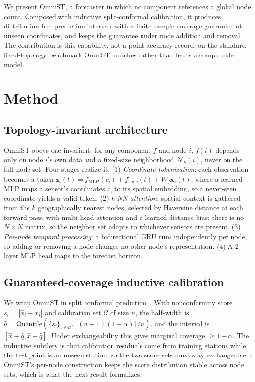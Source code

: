 \documentclass[conference]{IEEEtran}
\begin{document}
We present OmniST, a forecaster in which no component references a global node count. Composed with
inductive split-conformal calibration, it produces distribution-free prediction intervals with a
finite-sample coverage guarantee at unseen coordinates, and keeps the guarantee under node addition and
removal. The contribution is this capability, not a point-accuracy record: on the standard
fixed-topology benchmark OmniST matches rather than beats a comparable model.

\section{Method}

\subsection{Topology-invariant architecture}
OmniST obeys one invariant: for any component $f$ and node $i$, $f(i)$ depends only on node $i$'s own
data and a fixed-size neighborhood $\mathcal{N}_k(i)$, never on the full node set. Four stages realize
it. (1) \emph{Coordinate tokenization}: each observation becomes a token
$\mathbf{z}_i(t)=f_{\text{MLP}}(c_i)+f_{\text{time}}(t)+W_f\mathbf{x}_i(t)$, where a learned MLP maps a
sensor's coordinates $c_i$ to its spatial embedding, so a never-seen coordinate yields a valid token.
(2) \emph{$k$-NN attention}: spatial context is gathered from the $k$ geographically nearest nodes,
selected by Haversine distance at each forward pass, with multi-head attention and a learned distance
bias; there is no $N\times N$ matrix, so the neighbor set adapts to whichever sensors are present.
(3) \emph{Per-node temporal processing}: a bidirectional GRU runs independently per node, so adding or
removing a node changes no other node's representation. (4) A 2-layer MLP head maps to the forecast
horizon.

\subsection{Guaranteed-coverage inductive calibration}
We wrap OmniST in split conformal prediction~\cite{vovk2005algorithmic,angelopoulos2023conformal}.
With nonconformity score $s_i=|\hat{x}_i-x_i|$ and calibration set $\mathcal{C}$ of size $n$, the
half-width is $\hat q=\mathrm{Quantile}(\{s_i\}_{i\in\mathcal{C}},\lceil(n+1)(1-\alpha)\rceil/n)$, and
the interval is $[\hat{x}-\hat q,\hat{x}+\hat q]$. Under exchangeability this gives marginal coverage
$\ge 1-\alpha$. The inductive subtlety is that calibration residuals come from training stations while
the test point is an unseen station, so the two score sets must stay exchangeable~\cite{conformalinductivegnn2024}.
OmniST's per-node construction keeps the score distribution stable across node sets, which is what the
next result formalizes.
\end{document}
